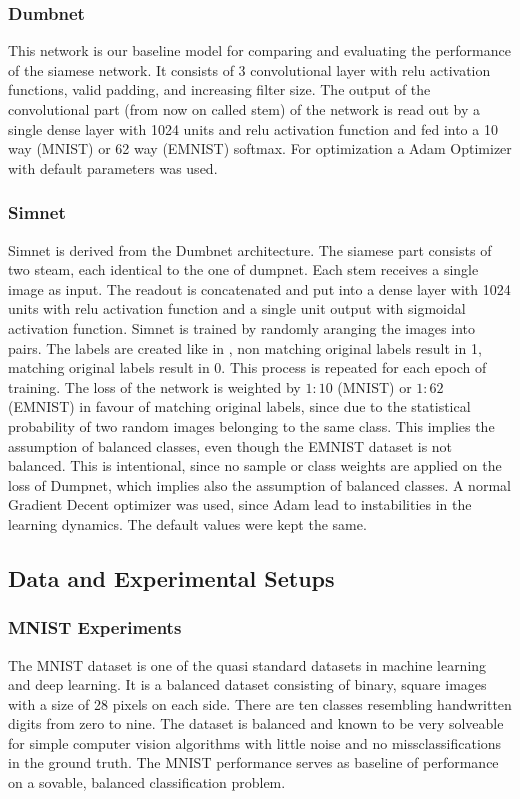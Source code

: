 \documentclass[a4paper,pt12]{article}
\begin{document}
\subsubsection{Dumbnet}
This network is our baseline model for comparing and evaluating the performance of the siamese network.  It consists of 3 convolutional layer with relu activation functions, valid padding, and increasing filter size. \newline
The output of the convolutional part (from now on called stem) of the network is read out by a single dense layer with 1024 units and relu activation function and fed into a 10 way (MNIST) or 62 way (EMNIST) softmax. For optimization a Adam Optimizer with default parameters was used.

\subsubsection{Simnet}
Simnet is derived from the Dumbnet architecture. The siamese part consists of two steam, each identical to the one of dumpnet. Each stem receives a single image as input. The readout is concatenated and put into a dense layer with 1024 units with relu activation function and a single unit output with sigmoidal activation function. \newline
Simnet is trained by randomly aranging the images into pairs. The labels are created like in \cite{siamese}, non matching original labels result in 1, matching original labels result in 0. This process is repeated for each epoch of training. \newline
The loss of the network is weighted by $1:10$ (MNIST) or $1:62$ (EMNIST) in favour of matching original labels, since due to the statistical probability of two random images belonging to the same class. This implies the assumption of balanced classes, even though the EMNIST dataset is not balanced. This is intentional, since no sample or class weights are applied on the loss of Dumpnet, which implies also the assumption of balanced classes. \newline
A normal Gradient Decent optimizer was used, since Adam lead to instabilities in the learning dynamics. The default values were kept the same.

\subsection{Data and Experimental Setups}

\subsubsection{MNIST Experiments}
The MNIST dataset is one of the quasi standard datasets in machine learning and deep learning. It is a balanced dataset consisting of binary, square images with a size of 28 pixels on each side. There are ten classes resembling handwritten digits from zero to nine. The dataset is balanced and known to be very solveable for simple computer vision algorithms with little noise and no missclassifications in the ground truth. \newline
The MNIST performance serves as baseline of performance on a sovable, balanced classification problem. 
\end{document}
